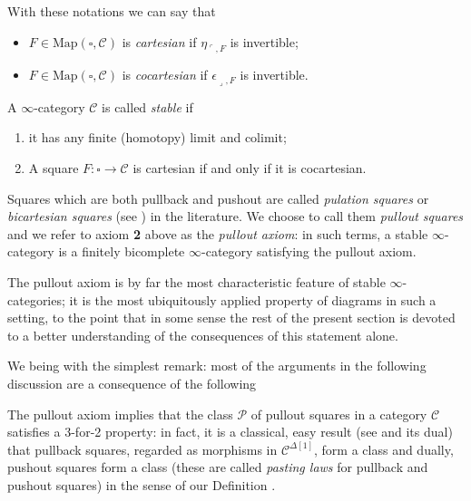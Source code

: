 \documentclass[11pt, a4paper]{amsart}
\renewcommand{\C}{\mathcal{C}}
\begin{document}
With these notations we can say that
\begin{itemize}
\item $F\in \text{Map}(\square, \C)$ is \emph{cartesian} if $\eta_{\ulcorner, F}$ is invertible;
\item $F\in \text{Map}(\square, \C)$ is \emph{cocartesian} if $\epsilon_{\lrcorner, F}$ is invertible.
\end{itemize}
\begin{definition}\label{def:stablequasi}
A $\infty$-category $\C$ is called \emph{stable} if
\begin{enumerate}
\item it has any finite (homotopy) limit and colimit;
\item A square $F\colon\square \to \C$ is cartesian if and only if it is cocartesian.
\end{enumerate}
\end{definition}
\begin{notat}\label{pullout.axiom}
Squares which are both pullback and pushout are called \emph{pulation squares} or \emph{bicartesian squares} (see \cite[Def. \textbf{11.32}]{acc}) in the literature.
We choose to call them \emph{pullout squares} and we refer to axiom \textbf{2} above as the \emph{pullout axiom}: in such terms, a stable $\infty$-category is a finitely bicomplete $\infty$-category satisfying the pullout axiom.
\end{notat}
\begin{remark}
The pullout axiom is by far the most characteristic feature of stable $\infty$-categories; it is the most ubiquitously applied property of diagrams in such a setting, to the point that in some sense the rest of the present section is devoted to a better understanding of the consequences of this statement alone.
\end{remark}
We being with the simplest remark: most of the arguments in the following discussion are a consequence of the following
\begin{remark}\label{a.3.for.2}
The pullout axiom implies that the class $\mathcal P$ of pullout squares in a category $\C$ satisfies a 3-for-2 property: in fact, it is a classical, easy result (see \cite[Prop. \textbf{11.10}]{acc} and its dual) that pullback squares, regarded as morphisms in $\C^{\Delta[1]}$, form a  class and dually, pushout squares form a  class (these are called \emph{pasting laws} for pullback and pushout squares) in the sense of our Definition .
\end{remark}
\end{document}
